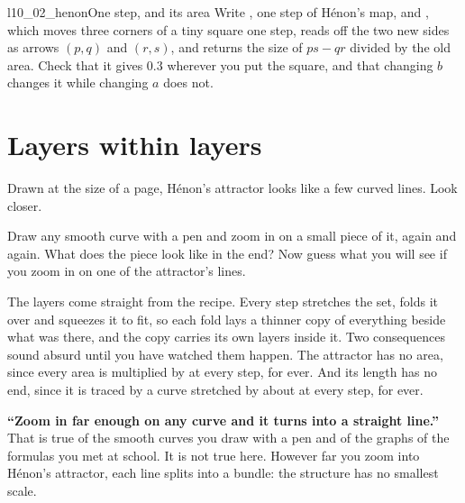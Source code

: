 \begin{lab}{l10_02_henon}{One step, and its area}
Write , one step of Hénon's map, and , which
moves three corners of a tiny square one step, reads off the two new sides as
arrows $(p, q)$ and $(r, s)$, and returns the size of $ps - qr$ divided by the
old area. Check that it gives \num{0.3} wherever you put the square, and that
changing $b$ changes it while changing $a$ does not.
\end{lab}

\section{Layers within layers}
\label{sec:ch10-zoom}

\noindent
Drawn at the size of a page, Hénon's attractor looks like a few curved lines.
Look closer.

\begin{think}
Draw any smooth curve with a pen and zoom in on a small piece of it, again
and again. What does the piece look like in the end? Now guess what you will
see if you zoom in on one of the attractor's lines.
\end{think}


\noindent
The layers come straight from the recipe. Every step stretches the set,
folds it over and squeezes it to fit, so each fold lays a thinner copy of
everything beside what was there, and the copy carries its own layers inside
it. Two consequences sound absurd until you have watched them happen.
The attractor has no area, since every area is multiplied by  at
every step, for ever. And its length has no end, since it is traced by a curve
stretched by about  at every step, for ever.

\begin{trapbox}
\textbf{\enquote{Zoom in far enough on any curve and it turns into a straight
line.}} That is true of the smooth curves you draw with a pen and of the
graphs of the formulas you met at school. It is not true here. However far you
zoom into Hénon's attractor, each line splits into a bundle: the structure has
no smallest scale.
\end{trapbox}

